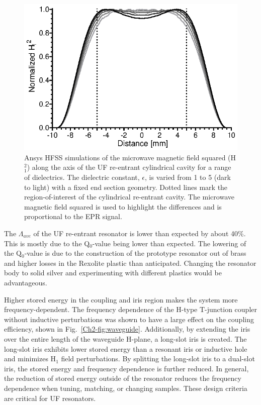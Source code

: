 \begin{figure}[htb]\centering
 \includegraphics{Kapitel/Ch2-Images/07-TE01UdielectircA.eps}
 \caption[Ansys HFSS simulations of with varying samples.]{Ansys HFSS simulations of the microwave magnetic field squared (H$^2_1$) along the axis of the UF re-entrant cylindrical \cylTE{} cavity for a range of dielectrics. The dielectric constant, $\epsilon$, is varied from 1 to 5 (dark to light) with a fixed end section geometry. Dotted lines mark the region-of-interest of the cylindrical re-entrant \cylTE{} cavity.  The microwave magnetic field squared is used to highlight the differences and is proportional to the EPR signal. }
 \label{Ch2-fig:dielectric}
\end{figure}

The $\Lambda_{ave}$ of the UF re-entrant \cylTE{} resonator is lower than expected by about 40\%. This is mostly due to the Q$_0$-value being lower than expected. The lowering of the Q$_0$-value is due to the construction of the prototype resonator out of brass and higher losses in the Rexolite plastic than anticipated. Changing the resonator body to solid silver and experimenting with different plastics would be advantageous. 

Higher stored energy in the coupling and iris region makes the system more frequency-dependent. The frequency dependence of the H-type T-junction coupler without inductive perturbations was shown to have a large effect on the coupling efficiency, shown in Fig.~\ref{Ch2-fig:waveguide}. Additionally, by extending the iris over the entire length of the waveguide H-plane, a long-slot iris is created. \cite{Mett2009} The long-slot iris exhibits lower stored energy than a resonant iris or inductive hole and minimizes H$_1$ field perturbations. By splitting the long-slot iris to a dual-slot iris, the stored energy and frequency dependence is further reduced. In general, the reduction of stored energy outside of the resonator reduces the frequency dependence when tuning, matching, or changing samples. These design criteria are critical for UF resonators. 

